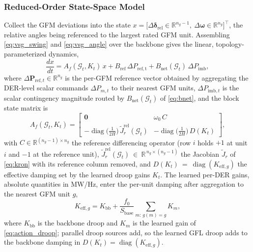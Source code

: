 \documentclass[lettersize,journal]{IEEEtran}
\begin{document}
	\subsubsection{Reduced-Order State-Space Model}
	Collect the GFM deviations into the state $x=\big[\Delta\boldsymbol{\delta}_{\mathrm{rel}}\in\mathbb{R}^{n_g-1},\ \Delta\boldsymbol{\omega}\in\mathbb{R}^{n_g}\big]^{\!\top}$, the relative angles being referenced to the largest rated GFM unit. Assembling \eqref{eq:vsg_swing} and \eqref{eq:vsg_angle} over the backbone gives the linear, topology-parameterized dynamics,
	\begin{equation}
		\frac{dx}{dt}
		= A_f(\mathcal{G}_t,K_t)\,x
		+ B_{\mathrm{ref}}\,\Delta P_{\mathrm{ref,t}}
		+ B_{\mathrm{net}}(\mathcal{G}_t)\,\Delta P_{\mathrm{imb}},
		\label{eq:statespace}
	\end{equation}
	where $\Delta \mathbf{P}_{\mathrm{ref},t} \in \mathbb{R}^{n_g}$ is the per-GFM reference vector obtained by aggregating the DER-level scalar commands $\Delta P_{m,t}$ to their nearest GFM units, $\Delta P_{\mathrm{imb},t}$ is the scalar contingency magnitude routed by $B_{\mathrm{net}}(\mathcal{G}_t)$ of \eqref{eq:bnet}, and the block state matrix is
	\begin{equation}
		A_f(\mathcal{G}_t,K_t)=
		\begin{bmatrix}
			\mathbf{0} & \omega_0\,C\\[4pt]
			-\operatorname{diag}\!\big(\tfrac{1}{2H}\big)\,\tilde{J}_r^{\mathrm{rel}}(\mathcal{G}_t)
			& -\operatorname{diag}\!\big(\tfrac{1}{2H}\big)\,D(K_t)
		\end{bmatrix},
		\label{eq:af_matrix}
	\end{equation}
	with $C\in\mathbb{R}^{(n_g-1)\times n_g}$ the reference differencing operator (row $i$ holds $+1$ at unit $i$ and $-1$ at the reference unit), $\tilde{J}_r^{\mathrm{rel}}(\mathcal{G}_t)~\in~\mathbb{R}^{\,n_g\times(n_g-1)}$ the Jacobian $\tilde{J}_r$ of \eqref{eq:kron} with its reference column removed, and $D(K_t)~=~\operatorname{diag}(K_{\mathrm{eff},g})$ the effective damping set by the learned droop gains $K_t$.
	The learned per-DER gains, absolute quantities in MW/Hz, enter the per-unit damping after aggregation to the nearest GFM unit $g$,
	\begin{equation}
		K_{\mathrm{eff},g}
		= K_{\mathrm{bb}}
		+ \frac{f_0}{S_{\mathrm{base}}}\sum_{m:\,g(m)=g} K_m ,
		\label{eq:kdroop_conv}
	\end{equation}
	where $K_{\mathrm{bb}}$ is the backbone droop and $K_m$ is the learned gain of \eqref{eq:action_droop}; parallel droop sources add, so the learned GFL droop adds to the backbone damping in $D(K_t)=\operatorname{diag}(K_{\mathrm{eff},g})$.
\end{document}
